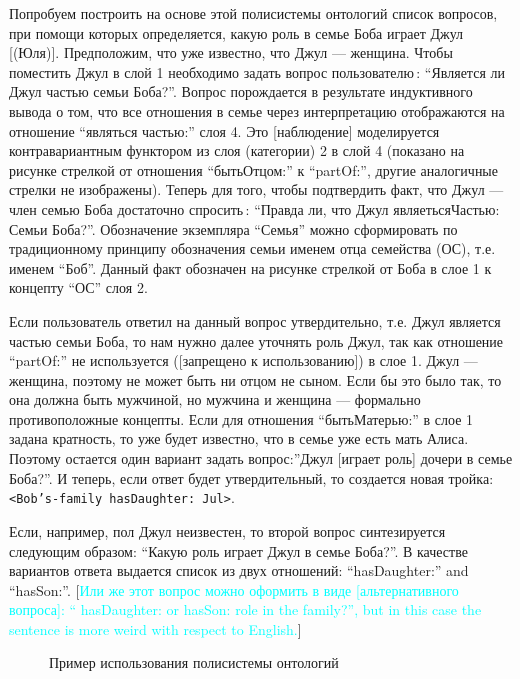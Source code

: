 \documentclass[utf8]{../IncArticle}
\newcommand{\e}[2][fcolor]{\textcolor{pcolor}{[}\textcolor{#1}{#2}\textcolor{pcolor}{]}}
\begin{document}
Попробуем построить на основе этой полисистемы онтологий список
вопросов, при помощи которых определяется, какую роль в семье Боба
играет Джул \e{(Юля)}.  Предположим, что уже известно, что Джул ---
женщина.  Чтобы поместить Джул в слой 1 необходимо задать вопрос
пользователю\,: ``Является ли Джул частью семьи Боба?''.  Вопрос
порождается в результате индуктивного вывода о том, что все отношения
в семье через интерпретацию отображаются на отношение ``являться
частью:'' слоя 4.  Это \e{наблюдение} моделируется контравариантным
функтором из слоя (категории) 2 в слой 4 (показано на рисунке
стрелкой от отношения ``бытьОтцом:'' к ``partOf:'', другие аналогичные
стрелки не изображены).  Теперь для того, чтобы подтвердить факт, что
Джул --- член семью Боба достаточно спросить\,: ``Правда ли, что Джул
являетьсяЧастью: Семьи Боба?''.  Обозначение экземпляра ``Семья''
можно сформировать по традиционному принципу обозначения семьи именем
отца семейства (ОС), т.е. именем ``Боб''.  Данный факт обозначен на
рисунке стрелкой от Боба в слое 1 к концепту ``ОС'' слоя 2.

Если пользователь ответил на данный вопрос утвердительно, т.е. Джул
является частью семьи Боба, то нам нужно далее уточнять роль Джул, так
как отношение ``partOf:'' не используется (\e{запрещено к
  использованию}) в слое 1.  Джул --- женщина, поэтому не может быть
ни отцом не сыном. Если бы это было так, то она должна быть мужчиной,
но мужчина и женщина --- формально противоположные концепты.  Если для
отношения ``бытьМатерью:'' в слое 1 задана кратность, то уже будет
известно, что в семье уже есть мать Алиса.  Поэтому остается один
вариант задать вопрос:''Джул [играет роль] дочери в семье Боба?''.  И
теперь, если ответ будет утвердительный, то создается новая тройка: \texttt{<Bob's-family hasDaughter: Jul>}.

Если, например, пол Джул неизвестен, то второй вопрос синтезируется
следующим образом: ``Какую роль играет Джул в семье Боба?''.  В
качестве вариантов ответа выдается список из двух отношений:
``hasDaughter:'' and ``hasSon:''.  \e[cyan]{Или же этот вопрос можно оформить в
виде \e{альтернативного вопроса}: `` hasDaughter: or hasSon: role in the family?'', but in this case the sentence is more weird with respect to English.}

\begin{figure}
{\centering\sf
\def\svgwidth{0.7\linewidth}
}
\caption{Пример использования полисистемы онтологий}
\label{OPSA}
\end{figure}
\end{document}
